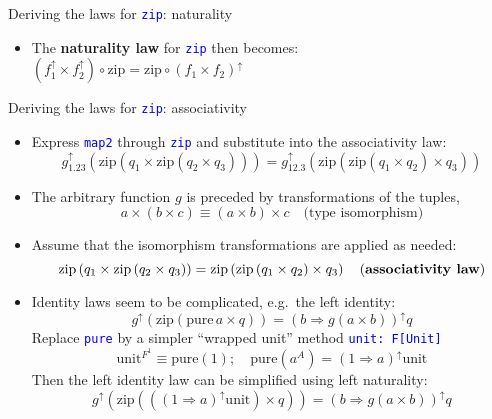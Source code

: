 \documentclass[english]{beamer}
\begin{document}
\begin{frame}{Deriving the laws for \texttt{\textcolor{blue}{\footnotesize{}zip}}:
naturality}
\begin{itemize}
{\begin{align*}
\left(f_{1}^{\uparrow}\times f_{2}^{\uparrow}\right)\circ\text{zip}\circ g^{\uparrow} & =\text{zip}\circ\left(f_{1}\times f_{2}\right)^{\uparrow}\circ g^{\uparrow}
\end{align*}
}{\footnotesize \par}
\item \vspace{-0.2cm}The \textbf{naturality law} for \texttt{\textcolor{blue}{\footnotesize{}zip}}
then becomes: {\footnotesize{}$\left(f_{1}^{\uparrow}\times f_{2}^{\uparrow}\right)\circ\text{zip}=\text{zip}\circ\left(f_{1}\times f_{2}\right)^{\uparrow}$} 
\end{itemize}
\end{frame}

\begin{frame}{Deriving the laws for \texttt{\textcolor{blue}{\footnotesize{}zip}}:
associativity}
\begin{itemize}
\item Express \texttt{\textcolor{blue}{\footnotesize{}map2}} through \texttt{\textcolor{blue}{\footnotesize{}zip}}
and substitute into the associativity law:{\footnotesize{}
\[
g_{1.23}^{\uparrow}\left(\text{zip}\left(q_{1}\times\text{zip}\left(q_{2}\times q_{3}\right)\right)\right)=g_{12.3}^{\uparrow}\left(\text{zip}\left(\text{zip}\left(q_{1}\times q_{2}\right)\times q_{3}\right)\right)
\]
}{\footnotesize \par}
\item The arbitrary function $g$ is preceded by transformations of the
tuples,{\footnotesize{}
\[
a\times\left(b\times c\right)\equiv\left(a\times b\right)\times c\quad\text{(type isomorphism)}
\]
}{\footnotesize \par}
\item Assume that the isomorphism transformations are applied as needed:{\footnotesize{}
\[
\text{zip}\left(q_{1}\times\text{zip}\left(q_{2}\times q_{3}\right)\right)=\text{zip}\left(\text{zip}\left(q_{1}\times q_{2}\right)\times q_{3}\right)\quad\text{(\textbf{associativity law})}
\]
}{\footnotesize \par}
\item Identity laws seem to be complicated, e.g.\ the left identity:{\footnotesize{}
\[
g^{\uparrow}\left(\text{zip}\left(\text{pure}\,a\times q\right)\right)=\left(b\Rightarrow g\left(a\times b\right)\right)^{\uparrow}q
\]
}Replace \texttt{\textcolor{blue}{\footnotesize{}pure}} by a simpler
``wrapped unit'' method \texttt{\textcolor{blue}{\footnotesize{}unit:\ F{[}Unit{]}}}{\footnotesize{}
\[
\text{unit}^{F^{1}}\equiv\text{pure}\left(1\right);\quad\text{pure}(a^{A})=\left(1\Rightarrow a\right)^{\uparrow}\text{unit}
\]
}Then the left identity law can be simplified using left naturality:{\footnotesize{}
\[
g^{\uparrow}\left(\text{zip}\left(\left(\left(1\Rightarrow a\right)^{\uparrow}\text{unit}\right)\times q\right)\right)=\left(b\Rightarrow g\left(a\times b\right)\right)^{\uparrow}q
\]
}{\footnotesize \par}
\end{itemize}
\end{frame}
\end{document}
